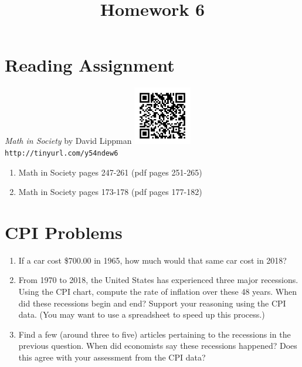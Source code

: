 \documentclass{article}
\title{Homework 6}
\date{}
\begin{document}
\maketitle

\section*{Reading Assignment}
\begin{center}
    {\em Math in Society} by David Lippman\newline
    \includegraphics[width=1in]{readings/society}\newline
    {\tt http://tinyurl.com/y54ndew6}
\end{center}
\begin{enumerate}
\item Math in Society pages 247-261 (pdf pages 251-265)
\item Math in Society pages 173-178 (pdf pages 177-182)
\end{enumerate}

\section{CPI Problems}
\begin{enumerate}
\item If a car cost \$700.00 in 1965, how much would that same car cost in 2018?
\item From 1970 to 2018, the United States has experienced three major recessions.  
Using the CPI chart, compute the rate of inflation over these 48 years.  When did
these recessions begin and end?  Support your reasoning using the CPI data.  (You 
may want to use a spreadsheet to speed up this process.)
\item Find a few (around three to five) articles pertaining to the recessions in the
previous question. When did economists say these recessions happened?  Does this agree
with your assessment from the CPI data?
\end{enumerate}
\end{document}
